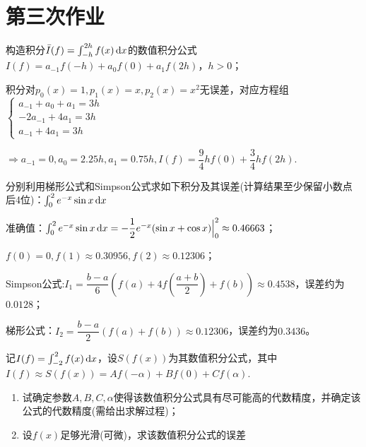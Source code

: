 \chapter{第三次作业}

    \begin{homework}[6pts]
        构造积分$\bar{I}(f)=\int_{-h}^{2h}f(x)\mathop{}\!\mathrm{d} x$的数值积分公式$I(f)=a_{-1}f(-h)+a_0 f(0)+a_1 f(2h)$，$h>0$；
    \end{homework}

    \begin{solution}
        积分对$p_0(x)=1,p_1(x)=x,p_2(x)=x^2$无误差，对应方程组$\begin{cases}a_{-1}+a_0+a_1=3h\\-2a_{-1}+4a_1=3h\\a_{-1}+4a_1=3h\end{cases}$

        $\Rightarrow a_{-1}=0,a_0=2.25h,a_1=0.75h,I(f)=\dfrac94 hf(0)+\dfrac34 hf(2h).$
    \end{solution}

    \begin{homework}[6pts]
        分别利用梯形公式和Simpson公式求如下积分及其误差(计算结果至少保留小数点后4位)：$\int_0^2 e^{-x}\sin x\mathop{}\!\mathrm{d} x$
    \end{homework}

    \begin{solution}
        准确值：$\int_0^2 e^{-x}\sin x\mathop{}\!\mathrm{d} x=-\dfrac12 e^{-x}(\sin x+\cos x)\Big|_0^2\approx 0.46663$；

        $ f(0)=0,f(1)\approx0.30956,f(2)\approx0.12306$；

        Simpson公式:$I_1=\dfrac{b-a}6\left(f(a)+4f\left(\dfrac{a+b}2\right)+f(b)\right)\approx0.4538$，误差约为$0.0128$；

        梯形公式：$I_2=\dfrac{b-a}{2}(f(a)+f(b))\approx0.12306$，误差约为$0.3436$。
    \end{solution}

    \begin{homework}[10pts]
        记$I(f)=\int_{-2}^2 f(x)\mathop{}\!\mathrm{d} x$，设$S(f(x))$为其数值积分公式，其中$I(f)\approx S(f(x))=Af(-\alpha)+Bf(0)+Cf(\alpha)$.
        \begin{enumerate}
            \item 试确定参数$A,B,C,\alpha$使得该数值积分公式具有尽可能高的代数精度，并确定该公式的代数精度(需给出求解过程)；
            \item 设$f(x)$足够光滑(可微)，求该数值积分公式的误差
        \end{enumerate}
    \end{homework}

